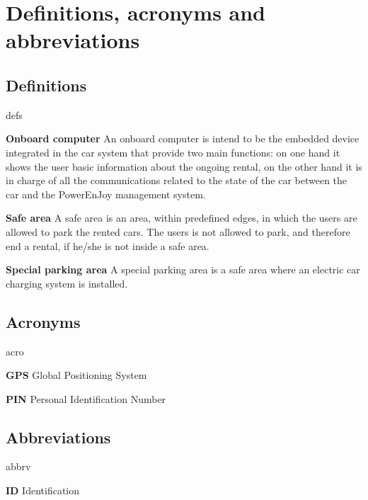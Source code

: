 \section{Definitions, acronyms and abbreviations}

\subsection{Definitions}
	\begin{labeling}{defs}
		\item[\textbf{Onboard computer}] An onboard computer is intend to be the embedded device integrated in the car system that provide two main functions: on one hand it shows the user basic information about the ongoing rental, on the other hand it is in charge of all the communications related to the state of the car between the car and the PowerEnJoy management system.
		\item[\textbf{Safe area}] A safe area is an area, within predefined edges, in which the users are allowed to park the rented cars. The users is not allowed to park, and therefore end a rental, if he/she is not inside a safe area.
		\item[\textbf{Special parking area}] A special parking area is a safe area where an electric car charging system is installed.
	\end{labeling}
\subsection{Acronyms}
	\begin{labeling}{acro}
		\item[\textbf{GPS}] Global Positioning System
		\item[\textbf{PIN}] Personal Identification Number
	\end{labeling}
\subsection{Abbreviations}
	\begin{labeling}{abbrv}
		\item[\textbf{ID}] Identification
	\end{labeling}